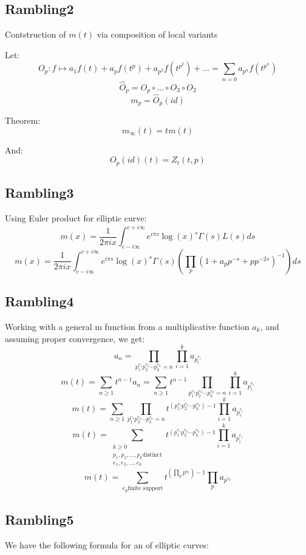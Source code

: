 \documentclass[a4paper]{amsart}
\begin{document}
\subsection{Rambling2}
Contstruction of $m(t)$ via composition of local variants 

Let:
$$O_p : f \mapsto a_1f(t) + a_pf(t^p) + a_{p^2}f(t^{p^2}) + \ldots = \sum_{n = 0} a_{p^n}f(t^{p^n})$$
$$\hat{O}_p = O_p \circ \ldots \circ O_3 \circ O_2$$
$$m_p = \hat{O}_p(id)$$

Theorem:
$$m_{\infty}(t) = t m(t)$$

And:
$$O_p(id)(t) = Z_t(t, p)$$

\subsection{Rambling3}
Using Euler product for elliptic curve:
$$m(x) = \frac{1}{2\pi i x} \int_{c - i\infty}^{c + i\infty}e^{i\pi s}\log(x)^s \Gamma(s)L(s)ds$$
$$m(x) = \frac{1}{2\pi i x} \int_{c - i\infty}^{c + i\infty}e^{i\pi s}\log(x)^s \Gamma(s)\left(\prod_p (1 + a_p p^{-s} + p p^{-2s})^{-1}\right)ds$$


\subsection{Rambling4}
Working with a general m function from a multiplicative function $a_k$, and assuming proper convergence, we get:
$$a_n = \prod_{p_1^{e_1}p_2^{e_2}\cdots p_k^{e_k} = n} \prod_{i = 1}^k a_{p_i^{e_i}}$$
$$m(t) = \sum_{n \ge 1}t^{n - 1}a_n = \sum_{n \ge 1}t^{n - 1} \prod_{p_1^{e_1}p_2^{e_2}\cdots p_k^{e_k} = n} \prod_{i = 1}^k a_{p_i^{e_i}}$$
$$m(t) = \sum_{n \ge 1} \prod_{p_1^{e_1}p_2^{e_2}\cdots p_k^{e_k} = n} t^{(p_1^{e_1}p_2^{e_2}\cdots p_k^{e_k}) - 1} \prod_{i = 1}^k a_{p_i^{e_i}}$$
$$m(t) = \sum_{\substack{k \ge 0 \\ p_1, p_2, \ldots, p_k \text{distinct} \\ e_1, e_2, \ldots, e_k}} t^{(p_1^{e_1}p_2^{e_2}\cdots p_k^{e_k}) - 1} \prod_{i = 1}^k a_{p_i^{e_i}}$$
$$m(t) = \sum_{e_p \text{finite support}} t^{(\prod_p p^{e_p}) - 1} \prod_p a_{p^{e_p}}$$


\subsection{Rambling5}
We have the following formula for an of elliptic curves:
\end{document}
